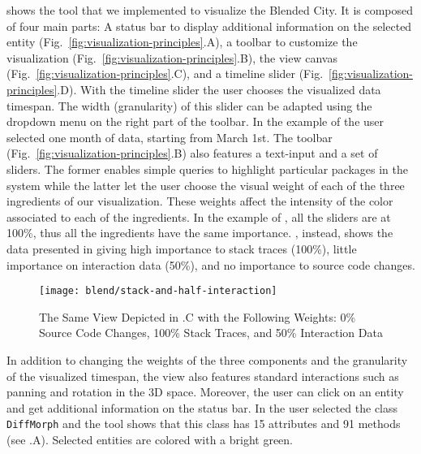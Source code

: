  shows the tool that we implemented to visualize the Blended City. It is composed of four main parts: A status bar to display additional information on the selected entity (Fig.~\ref{fig:visualization-principles}.A), a toolbar to customize the visualization (Fig.~\ref{fig:visualization-principles}.B), the view canvas (Fig.~\ref{fig:visualization-principles}.C), and a timeline slider (Fig.~\ref{fig:visualization-principles}.D). With the timeline slider the user chooses the visualized data timespan. The width (\ie granularity) of this slider can be adapted using the dropdown menu on the right part of the toolbar. In the example of  the user selected one month of data, starting from March 1st.  The toolbar (Fig.~\ref{fig:visualization-principles}.B) also features a text-input and a set of sliders. The former enables simple queries to highlight particular packages in the system while the latter let the user choose the visual weight of each of the three ingredients of our visualization. These weights affect the intensity of the color associated to each of the ingredients. In the example of , all the sliders are at 100\%, thus all the ingredients have the same importance. , instead, shows the data presented in  giving high importance to stack traces (100\%), little importance on interaction data (50\%), and no importance to source code changes. 

\begin{figure}[ht]
\centering
\texttt{[image: blend/stack-and-half-interaction]}
\caption{The Same View Depicted in .C with the Following Weights: 0\% Source Code Changes, 100\% Stack Traces, and 50\% Interaction Data}
\label{fig:stack-and-half-interaction}
\end{figure}

In addition to changing the weights of the three components and the granularity of the visualized timespan, the view also features standard interactions such as panning and rotation in the 3D space. Moreover, the user can click on an entity and get additional information on the status bar. In  the user selected the class \texttt{DiffMorph} and the tool shows that this class has 15 attributes and 91 methods (see .A). Selected entities are colored with a bright green.


